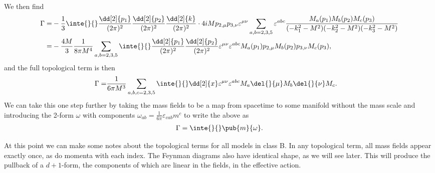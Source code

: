 We then find
\begin{align*}
	\Gamma =& -\frac{1}{3}\inte{}{}\frac{\dd[2]{p_{1}}}{(2\pi)^{2}}\frac{\dd[2]{p_{2}}}{(2\pi)^{2}}\frac{\dd[2]{k}}{(2\pi)^{2}}\cdot 4iMp_{2, \mu}p_{3, \nu}\varepsilon^{\mu\nu}\sum\limits_{a, b = 2, 3, 5}\varepsilon^{abc}\frac{M_{a}(p_{1})M_{b}(p_{2})M_{c}(p_{3})}{(-k_{1}^{2} - M^{2})(-k_{2}^{2} - M^{2})(-k_{3}^{2} - M^{2})} \\
	       =& -\frac{4M}{3}\frac{1}{8\pi M^{4}}\sum\limits_{a, b = 2, 3, 5}\inte{}{}\frac{\dd[2]{p_{1}}}{(2\pi)^{2}}\frac{\dd[2]{p_{2}}}{(2\pi)^{2}}\varepsilon^{\mu\nu}\varepsilon^{abc}M_{a}(p_{1})p_{2, \mu}M_{b}(p_{2})p_{3, \nu}M_{c}(p_{3}),
\end{align*}
and the full topological term is then
\begin{align*}
	\Gamma =& \frac{1}{6\pi M^{3}}\sum\limits_{a, b, c = 2, 3, 5}\inte{}{}\dd[2]{x}\varepsilon^{\mu\nu}\varepsilon^{abc}M_{a}\del{}{\mu}M_{b}\del{}{\nu}M_{c}.
\end{align*}
We can take this one step further by taking the mass fields to be a map from spacetime to some manifold without the mass scale and introducing the 2-form $\omega$ with components $\omega_{ab} = \frac{1}{6\pi}\varepsilon_{cab}m^{c}$ to write the above as
\begin{align*}
	\Gamma = \inte{}{}\pub{m}{\omega}.
\end{align*}

At this point we can make some notes about the topological terms for all models in class B. In any topological term, all mass fields appear exactly once, as do momenta with each index. The Feynman diagrams also have identical shape, as we will see later. This will produce the pullback of a $d + 1$-form, the components of which are linear in the fields, in the effective action.

